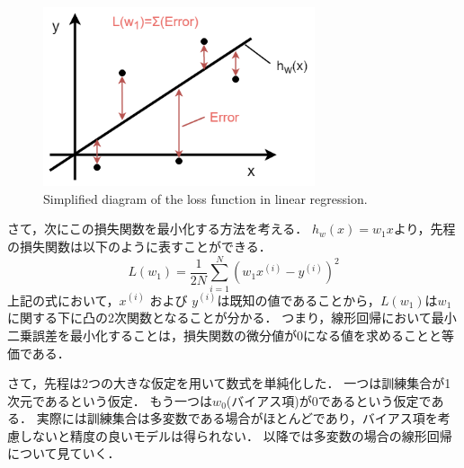     \begin{figure}[t]
        \begin{center}
            \includegraphics[width=8.0cm]{./8_appendix/img/error}
            \caption{Simplified diagram of the loss function in linear regression.}
            \label{2_linerregression_loss}
        \end{center}
    \end{figure}
    
    さて，次にこの損失関数を最小化する方法を考える．
    $h_w(x)=w_1 x$より，先程の損失関数は以下のように表すことができる．
    \begin{equation}
        L(w_1) = \frac{1}{2N}\sum_{i=1}^{N}\left(w_1 x^{(i)} - y^{(i)}\right)^2
    \end{equation}
    上記の式において，$x^{(i)}$ および $y^{(i)}$は既知の値であることから，$L(w_1)$は$w_1$に関する下に凸の2次関数となることが分かる．
    つまり，線形回帰において最小二乗誤差を最小化することは，損失関数の微分値が0になる値を求めることと等価である．
    
    さて，先程は2つの大きな仮定を用いて数式を単純化した．
    一つは訓練集合が1次元であるという仮定．
    もう一つは$w_0$(バイアス項)が0であるという仮定である．
    実際には訓練集合は多変数である場合がほとんどであり，バイアス項を考慮しないと精度の良いモデルは得られない．
    以降では多変数の場合の線形回帰について見ていく．
    
